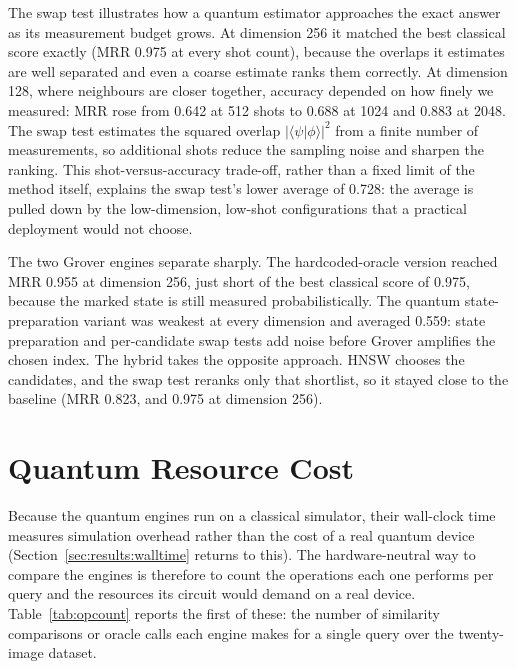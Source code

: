 The swap test illustrates how a quantum estimator approaches the exact answer as
its measurement budget grows. At dimension 256 it matched the best classical
score exactly (MRR 0.975 at every shot count), because the overlaps it estimates
are well separated and even a coarse estimate ranks them correctly. At dimension
128, where neighbours are closer together, accuracy depended on how finely we
measured: MRR rose from 0.642 at 512 shots to 0.688 at 1024 and 0.883 at 2048.
The swap test estimates the squared overlap $|\langle\psi|\phi\rangle|^2$ from
a finite number of measurements, so additional shots reduce the sampling noise
and sharpen the ranking. This shot-versus-accuracy trade-off, rather than a
fixed limit of the method itself, explains the swap test's lower average of
0.728: the average is pulled down by the low-dimension, low-shot configurations
that a practical deployment would not choose.

The two Grover engines separate sharply. The hardcoded-oracle version reached
MRR 0.955 at dimension 256, just short of the best classical score of 0.975,
because the marked state is still measured probabilistically. The quantum
state-preparation variant was weakest at every dimension and averaged 0.559:
state preparation and
per-candidate swap tests add noise before Grover amplifies the chosen index. The
hybrid takes the opposite approach. HNSW chooses the candidates, and the swap
test reranks only that shortlist, so it stayed close to the baseline (MRR 0.823,
and 0.975 at dimension 256).

\section{Quantum Resource Cost}
\label{sec:results:cost}


Because the quantum engines run on a classical simulator, their wall-clock time
measures simulation overhead rather than the cost of a real quantum device
(Section~\ref{sec:results:walltime} returns to this). The hardware-neutral way
to compare the engines is therefore to count the operations each one performs per
query and the resources its circuit would demand on a real device.
Table~\ref{tab:opcount} reports the first of these: the number of similarity
comparisons or oracle calls each engine makes for a single query over the
twenty-image dataset.

